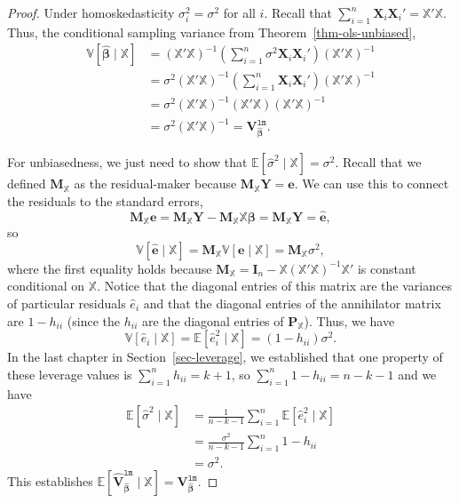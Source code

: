 \documentclass[
  13pt,
  letterpaper,
  DIV=11,
  numbers=noendperiod]{scrreprt}
\newcommand{\mb}{\symbf}
\newcommand{\E}{\mathbb{E}}
\newcommand{\V}{\mathbb{V}}
\newcommand{\X}{\mb{X}}
\newcommand{\Xmat}{\mathbb{X}}
\newcommand{\bfbeta}{\mb{\beta}}
\newcommand{\bhat}{\widehat{\mb{\beta}}}
\theoremstyle{plain}
\theoremstyle{definition}
\theoremstyle{definition}
\theoremstyle{remark}
\begin{document}
\begin{proof}
Under homoskedasticity \(\sigma^2_i = \sigma^2\) for all \(i\). Recall
that \(\sum_{i=1}^n \X_i\X_i' = \Xmat'\Xmat\). Thus, the conditional
sampling variance from Theorem~\ref{thm-ols-unbiased}, \[ 
\begin{aligned}
\V[\bhat \mid \Xmat] &= \left( \Xmat'\Xmat \right)^{-1}\left( \sum_{i=1}^n \sigma^2 \X_i\X_i' \right) \left( \Xmat'\Xmat \right)^{-1} \\ &= \sigma^2\left( \Xmat'\Xmat \right)^{-1}\left( \sum_{i=1}^n \X_i\X_i' \right) \left( \Xmat'\Xmat \right)^{-1} \\&= \sigma^2\left( \Xmat'\Xmat \right)^{-1}\left( \Xmat'\Xmat \right) \left( \Xmat'\Xmat \right)^{-1} \\&= \sigma^2\left( \Xmat'\Xmat \right)^{-1} = \mb{V}^{\texttt{lm}}_{\bhat}.
\end{aligned}
\]

For unbiasedness, we just need to show that
\(\E[\widehat{\sigma}^{2} \mid \Xmat] = \sigma^2\). Recall that we
defined \(\mb{M}_{\Xmat}\) as the residual-maker because
\(\mb{M}_{\Xmat}\mb{Y} = \widehat{\mb{e}}\). We can use this to connect
the residuals to the standard errors, \[ 
\mb{M}_{\Xmat}\mb{e} = \mb{M}_{\Xmat}\mb{Y} - \mb{M}_{\Xmat}\Xmat\bfbeta = \mb{M}_{\Xmat}\mb{Y} = \widehat{\mb{e}},
\] so \[
\V[\widehat{\mb{e}} \mid \Xmat] = \mb{M}_{\Xmat}\V[\mb{e} \mid \Xmat] = \mb{M}_{\Xmat}\sigma^2,
\] where the first equality holds because
\(\mb{M}_{\Xmat} = \mb{I}_{n} - \Xmat (\Xmat'\Xmat)^{-1} \Xmat'\) is
constant conditional on \(\Xmat\). Notice that the diagonal entries of
this matrix are the variances of particular residuals \(\widehat{e}_i\)
and that the diagonal entries of the annihilator matrix are
\(1 - h_{ii}\) (since the \(h_{ii}\) are the diagonal entries of
\(\mb{P}_{\Xmat}\)). Thus, we have \[ 
\V[\widehat{e}_i \mid \Xmat] = \E[\widehat{e}_{i}^{2} \mid \Xmat] = (1 - h_{ii})\sigma^{2}.
\] In the last chapter in Section~\ref{sec-leverage}, we established
that one property of these leverage values is
\(\sum_{i=1}^n h_{ii} = k+ 1\), so
\(\sum_{i=1}^n 1- h_{ii} = n - k - 1\) and we have \[ 
\begin{aligned}
  \E[\widehat{\sigma}^{2} \mid \Xmat] &= \frac{1}{n-k-1} \sum_{i=1}^{n} \E[\widehat{e}_{i}^{2} \mid \Xmat] \\
                                      &= \frac{\sigma^{2}}{n-k-1} \sum_{i=1}^{n} 1 - h_{ii} \\
                                      &= \sigma^{2}. 
\end{aligned}
\] This establishes
\(\E[\widehat{\mb{V}}^{\texttt{lm}}_{\bhat} \mid \Xmat] = \mb{V}^{\texttt{lm}}_{\bhat}\).
\end{proof}
\end{document}
